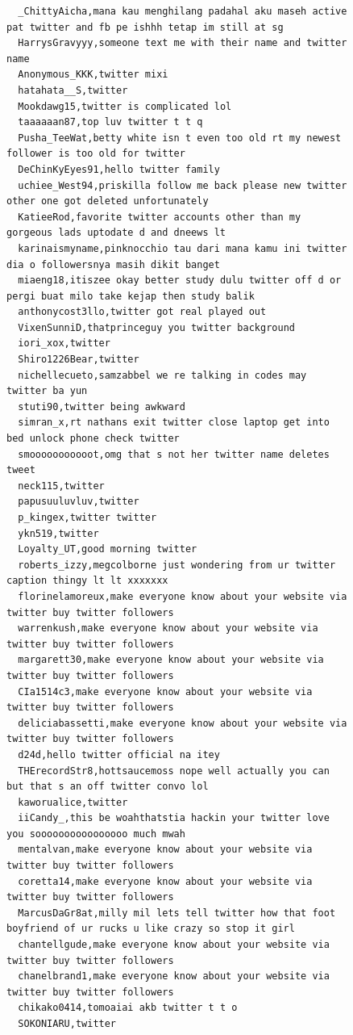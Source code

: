 \begin{figure}[htpb]
\begin{verbatim}
  _ChittyAicha,mana kau menghilang padahal aku maseh active pat twitter and fb pe ishhh tetap im still at sg
  HarrysGravyyy,someone text me with their name and twitter name
  Anonymous_KKK,twitter mixi
  hatahata__S,twitter
  Mookdawg15,twitter is complicated lol
  taaaaaan87,top luv twitter t t q
  Pusha_TeeWat,betty white isn t even too old rt my newest follower is too old for twitter
  DeChinKyEyes91,hello twitter family
  uchiee_West94,priskilla follow me back please new twitter other one got deleted unfortunately
  KatieeRod,favorite twitter accounts other than my gorgeous lads uptodate d and dneews lt
  karinaismyname,pinknocchio tau dari mana kamu ini twitter dia o followersnya masih dikit banget
  miaeng18,itiszee okay better study dulu twitter off d or pergi buat milo take kejap then study balik
  anthonycost3llo,twitter got real played out
  VixenSunniD,thatprinceguy you twitter background
  iori_xox,twitter
  Shiro1226Bear,twitter
  nichellecueto,samzabbel we re talking in codes may twitter ba yun
  stuti90,twitter being awkward
  simran_x,rt nathans exit twitter close laptop get into bed unlock phone check twitter
  smooooooooooot,omg that s not her twitter name deletes tweet
  neck115,twitter
  papusuuluvluv,twitter
  p_kingex,twitter twitter
  ykn519,twitter
  Loyalty_UT,good morning twitter
  roberts_izzy,megcolborne just wondering from ur twitter caption thingy lt lt xxxxxxx
  florinelamoreux,make everyone know about your website via twitter buy twitter followers
  warrenkush,make everyone know about your website via twitter buy twitter followers
  margarett30,make everyone know about your website via twitter buy twitter followers
  CIa1514c3,make everyone know about your website via twitter buy twitter followers
  deliciabassetti,make everyone know about your website via twitter buy twitter followers
  d24d,hello twitter official na itey
  THErecordStr8,hottsaucemoss nope well actually you can but that s an off twitter convo lol
  kaworualice,twitter
  iiCandy_,this be woahthatstia hackin your twitter love you soooooooooooooooo much mwah
  mentalvan,make everyone know about your website via twitter buy twitter followers
  coretta14,make everyone know about your website via twitter buy twitter followers
  MarcusDaGr8at,milly mil lets tell twitter how that foot boyfriend of ur rucks u like crazy so stop it girl
  chantellgude,make everyone know about your website via twitter buy twitter followers
  chanelbrand1,make everyone know about your website via twitter buy twitter followers
  chikako0414,tomoaiai akb twitter t t o
  SOKONIARU,twitter

\end{verbatim}
\end{figure}

